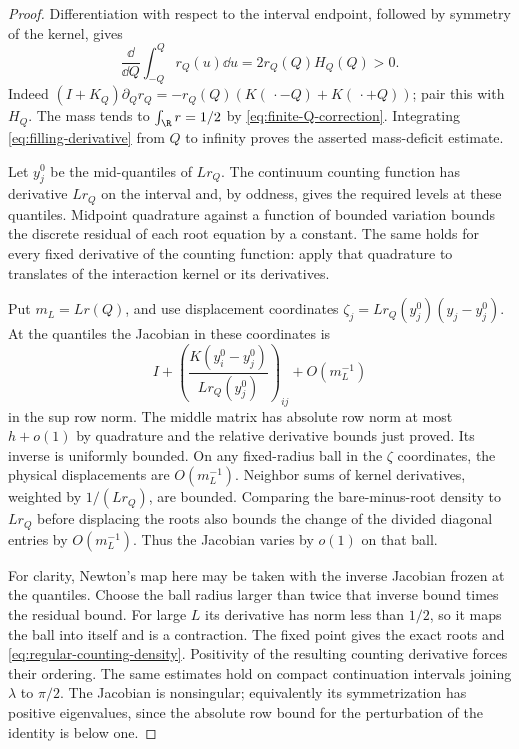 \begin{proof}
Differentiation with respect to the interval endpoint, followed by
symmetry of the kernel, gives
\begin{equation}\label{eq:filling-derivative}
 \frac{\dd}{\dd Q}\int_{-Q}^Q r_Q(u)\dd u
       =2r_Q(Q)H_Q(Q)>0.
\end{equation}
Indeed $(I+K_Q)\partial_Qr_Q
=-r_Q(Q)(K(\,\cdot-Q)+K(\,\cdot+Q))$; pair this with $H_Q$.
The mass tends to $\int_\R r=1/2$ by
\eqref{eq:finite-Q-correction}.  Integrating
\eqref{eq:filling-derivative} from $Q$ to infinity proves the
asserted mass-deficit estimate.

Let $y_j^0$ be the mid-quantiles of $Lr_Q$.
The continuum counting function has derivative $Lr_Q$ on the
interval and, by oddness, gives the required levels at these
quantiles.  Midpoint quadrature against a function of bounded
variation bounds the discrete residual of each root equation by
a constant.  The same holds for every fixed derivative of the
counting function: apply that quadrature to translates of the
interaction kernel or its derivatives.

Put $m_L=Lr(Q)$, and use displacement coordinates
$\zeta_j=Lr_Q(y_j^0)(y_j-y_j^0)$.  At the quantiles the Jacobian in
these coordinates is
\[
 I+\left(\frac{K(y_i^0-y_j^0)}{Lr_Q(y_j^0)}\right)_{ij}
       +O(m_L^{-1})
\]
in the sup row norm.  The middle matrix has absolute row norm
at most $h+o(1)$ by quadrature and the relative derivative bounds
just proved.  Its inverse is uniformly bounded.
On any fixed-radius ball in the $\zeta$ coordinates, the physical
displacements are $O(m_L^{-1})$.  Neighbor sums of kernel
derivatives, weighted by $1/(Lr_Q)$, are bounded.  Comparing the
bare-minus-root density to $Lr_Q$ before displacing the roots
also bounds the change of the divided diagonal entries by
$O(m_L^{-1})$.  Thus the Jacobian varies by $o(1)$ on that ball.

For clarity, Newton's map here may be taken with the inverse
Jacobian frozen at the quantiles.  Choose the ball radius larger
than twice that inverse bound times the residual bound.
For large $L$ its derivative has norm less than $1/2$, so it maps
the ball into itself and is a contraction.  The fixed point gives
the exact roots and \eqref{eq:regular-counting-density}.
Positivity of the resulting counting derivative forces their
ordering.  The same estimates hold on compact continuation
intervals joining $\lambda$ to $\pi/2$.  The Jacobian is
nonsingular; equivalently its symmetrization has positive
eigenvalues, since the absolute row bound for the perturbation of
the identity is below one.


\end{proof}

